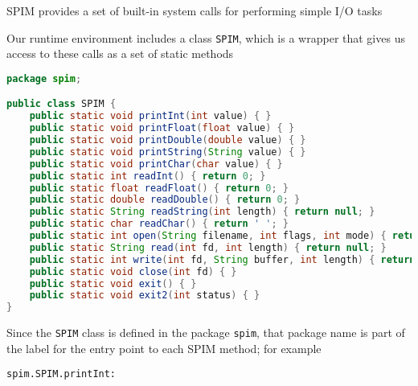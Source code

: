 \documentclass[8pt,a4paper,compress]{beamer}
\begin{document}
\begin{frame}[fragile]
\pause

SPIM provides a set of built-in system calls for performing simple I/O tasks

\pause
\bigskip

Our runtime environment includes a class \lstinline{SPIM}, which is a wrapper that gives us access to these calls as a set of static methods

\begin{lstlisting}[language=Java,style=focusin]
package spim;

public class SPIM {
    public static void printInt(int value) { }
    public static void printFloat(float value) { }
    public static void printDouble(double value) { }
    public static void printString(String value) { }
    public static void printChar(char value) { }
    public static int readInt() { return 0; }
    public static float readFloat() { return 0; }
    public static double readDouble() { return 0; }
    public static String readString(int length) { return null; }
    public static char readChar() { return ' '; }
    public static int open(String filename, int flags, int mode) { return 0; }
    public static String read(int fd, int length) { return null; }
    public static int write(int fd, String buffer, int length) { return 0; }
    public static void close(int fd) { }
    public static void exit() { }
    public static void exit2(int status) { }
}
\end{lstlisting}

\pause
\bigskip

Since the \lstinline{SPIM} class is defined in the package \lstinline{spim}, that package name is part of the label for the entry point to each SPIM method; for example
\begin{lstlisting}[language={}]
spim.SPIM.printInt:
\end{lstlisting}
\end{frame}
\end{document}
